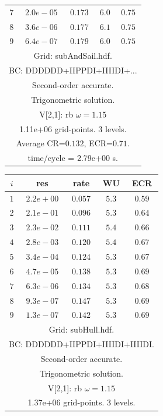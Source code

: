 \begin{table}[hbt]
\begin{center}
{\begin{tabular}{|c|c|c|c|c|}
 $ 7$  & $ 2.0e-05$ & $0.173$ & $ 6.0$ & $0.75$ \\ 
 $ 8$  & $ 3.6e-06$ & $0.177$ & $ 6.1$ & $0.75$ \\ 
 $ 9$  & $ 6.4e-07$ & $0.179$ & $ 6.0$ & $0.75$ \\ 
\hline 
\multicolumn{5}{|c|}{Grid: subAndSail.hdf.}  \\
\multicolumn{5}{|c|}{BC: DDDDDD+IIPPDI+IIIIDI+...}  \\
\multicolumn{5}{|c|}{Second-order accurate.}  \\
\multicolumn{5}{|c|}{Trigonometric solution.}  \\
\multicolumn{5}{|c|}{V[2,1]: rb $\omega=1.15$}  \\
\multicolumn{5}{|c|}{1.11e+06 grid-points. 3 levels.}  \\
\multicolumn{5}{|c|}{Average CR=$0.132$, ECR=$0.71$.}  \\
\multicolumn{5}{|c|}{time/cycle = 2.79e+00 s.}  \\
\hline 
\end{tabular}
\begin{tabular}{|c|c|c|c|c|} \hline 
 $i$   & res      & rate    &  WU    & ECR  \\   \hline 
 $ 1$  & $ 2.2e+00$ & $0.057$ & $ 5.3$ & $0.59$ \\ 
 $ 2$  & $ 2.1e-01$ & $0.096$ & $ 5.3$ & $0.64$ \\ 
 $ 3$  & $ 2.3e-02$ & $0.111$ & $ 5.4$ & $0.66$ \\ 
 $ 4$  & $ 2.8e-03$ & $0.120$ & $ 5.4$ & $0.67$ \\ 
 $ 5$  & $ 3.4e-04$ & $0.124$ & $ 5.3$ & $0.67$ \\ 
 $ 6$  & $ 4.7e-05$ & $0.138$ & $ 5.3$ & $0.69$ \\ 
 $ 7$  & $ 6.3e-06$ & $0.134$ & $ 5.3$ & $0.68$ \\ 
 $ 8$  & $ 9.3e-07$ & $0.147$ & $ 5.3$ & $0.69$ \\ 
 $ 9$  & $ 1.3e-07$ & $0.142$ & $ 5.3$ & $0.69$ \\ 
\hline 
\multicolumn{5}{|c|}{Grid: subHull.hdf.}  \\
\multicolumn{5}{|c|}{BC: DDDDDD+IIPPDI+IIIIDI+IIIIDI.}  \\
\multicolumn{5}{|c|}{Second-order accurate.}  \\
\multicolumn{5}{|c|}{Trigonometric solution.}  \\
\multicolumn{5}{|c|}{V[2,1]: rb $\omega=1.15$}  \\
\multicolumn{5}{|c|}{1.37e+06 grid-points. 3 levels.}  \\

\end{tabular}}
\end{center}
\end{table}
